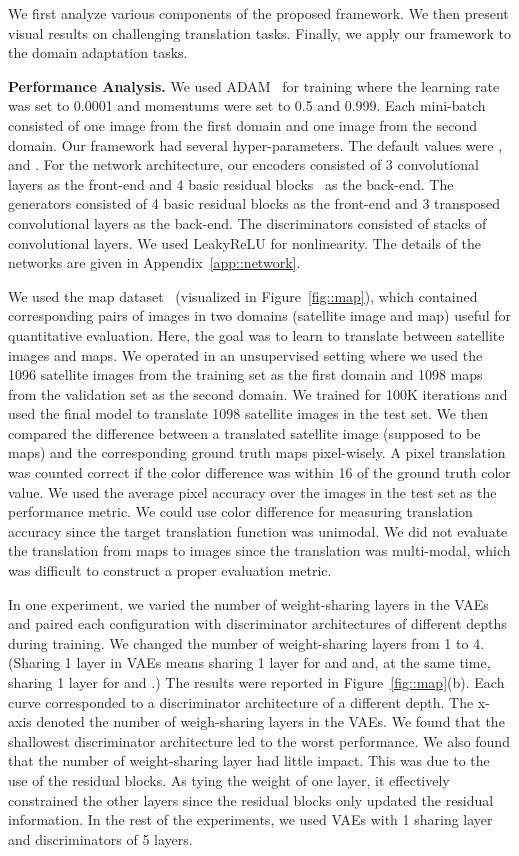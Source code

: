 \documentclass{article}
\begin{document}
We first analyze various components of the proposed framework. We then present visual results on challenging translation tasks. Finally, we apply our framework to the domain adaptation tasks.

{\bf Performance Analysis.} We used ADAM~\cite{kingma2014adam} for training where the learning rate was set to 0.0001 and momentums were set to 0.5 and 0.999. Each mini-batch consisted of one image from the first domain and one image from the second domain. Our framework had several hyper-parameters. The default values were ,  and . For the network architecture, our encoders consisted of 3 convolutional layers as the front-end and 4 basic residual blocks~\cite{he2016deep} as the back-end. The generators consisted of 4 basic residual blocks as the front-end and 3 transposed convolutional layers as the back-end. The discriminators consisted of stacks of convolutional layers. We used LeakyReLU for nonlinearity. The details of the networks are given in Appendix~\ref{app::network}.

We used the map dataset~\cite{isola2016image} (visualized in Figure~\ref{fig::map}), which contained corresponding pairs of images in two domains (satellite image and map) useful for quantitative evaluation. Here, the goal was to learn to translate between satellite images and maps. We operated in an unsupervised setting where we used the 1096 satellite images from the training set as the first domain and 1098 maps from the validation set as the second domain. We trained for 100K iterations and used the final model to translate 1098 satellite images in the test set. We then compared the difference between a translated satellite image (supposed to be maps) and the corresponding ground truth maps pixel-wisely. A pixel translation was counted correct if the color difference was within 16 of the ground truth color value. We used the average pixel accuracy over the images in the test set as the performance metric. We could use color difference for measuring translation accuracy since the target translation function was unimodal. We did not evaluate the translation from maps to images since the translation was multi-modal, which was difficult to construct a proper evaluation metric.

In one experiment, we varied the number of weight-sharing layers in the VAEs and paired each configuration with discriminator architectures of different depths during training. We changed the number of weight-sharing layers from 1 to 4. (Sharing 1 layer in VAEs means sharing 1 layer for  and  and, at the same time, sharing 1 layer for  and .) The results were reported in Figure~\ref{fig::map}(b). Each curve corresponded to a discriminator architecture of a different depth. The x-axis denoted the number of weigh-sharing layers in the VAEs. We found that the shallowest discriminator architecture led to the worst performance. We also found that the number of weight-sharing layer had little impact. This was due to the use of the residual blocks. As tying the weight of one layer, it effectively constrained the other layers since the residual blocks only updated the residual information. In the rest of the experiments, we used VAEs with 1 sharing layer and discriminators of 5 layers.
\end{document}
